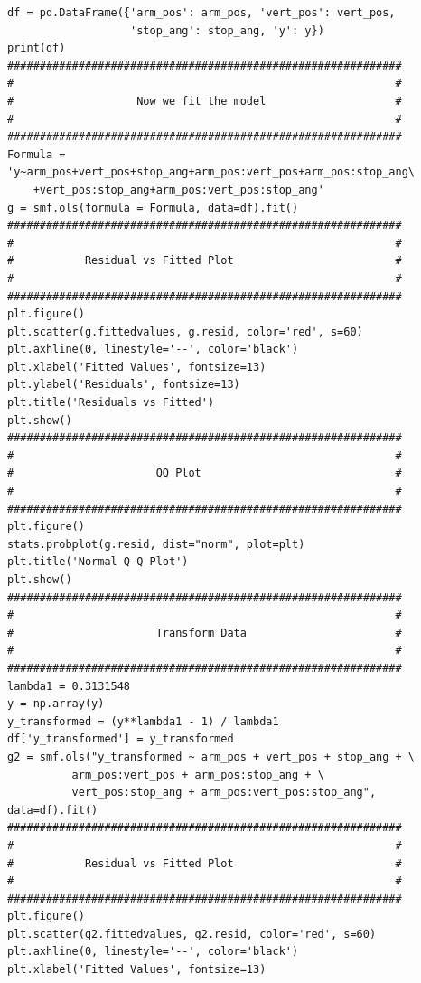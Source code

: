 \documentclass[11pt]{article}
\begin{document}
\begin{verbatim}
df = pd.DataFrame({'arm_pos': arm_pos, 'vert_pos': vert_pos,
                   'stop_ang': stop_ang, 'y': y})
print(df)
#############################################################
#                                                           #
#                   Now we fit the model                    #
#                                                           #
#############################################################
Formula = 'y~arm_pos+vert_pos+stop_ang+arm_pos:vert_pos+arm_pos:stop_ang\
    +vert_pos:stop_ang+arm_pos:vert_pos:stop_ang'
g = smf.ols(formula = Formula, data=df).fit()
#############################################################
#                                                           #
#           Residual vs Fitted Plot                         #
#                                                           #
#############################################################
plt.figure()
plt.scatter(g.fittedvalues, g.resid, color='red', s=60)
plt.axhline(0, linestyle='--', color='black')
plt.xlabel('Fitted Values', fontsize=13)
plt.ylabel('Residuals', fontsize=13)
plt.title('Residuals vs Fitted')
plt.show()
#############################################################
#                                                           #
#                      QQ Plot                              #
#                                                           #
#############################################################
plt.figure()
stats.probplot(g.resid, dist="norm", plot=plt)
plt.title('Normal Q-Q Plot')
plt.show()
#############################################################
#                                                           #
#                      Transform Data                       #
#                                                           #
#############################################################
lambda1 = 0.3131548
y = np.array(y)
y_transformed = (y**lambda1 - 1) / lambda1
df['y_transformed'] = y_transformed
g2 = smf.ols("y_transformed ~ arm_pos + vert_pos + stop_ang + \
          arm_pos:vert_pos + arm_pos:stop_ang + \
          vert_pos:stop_ang + arm_pos:vert_pos:stop_ang", data=df).fit()
#############################################################
#                                                           #
#           Residual vs Fitted Plot                         #
#                                                           #
#############################################################
plt.figure()
plt.scatter(g2.fittedvalues, g2.resid, color='red', s=60)
plt.axhline(0, linestyle='--', color='black')
plt.xlabel('Fitted Values', fontsize=13)

\end{verbatim}
\end{document}

